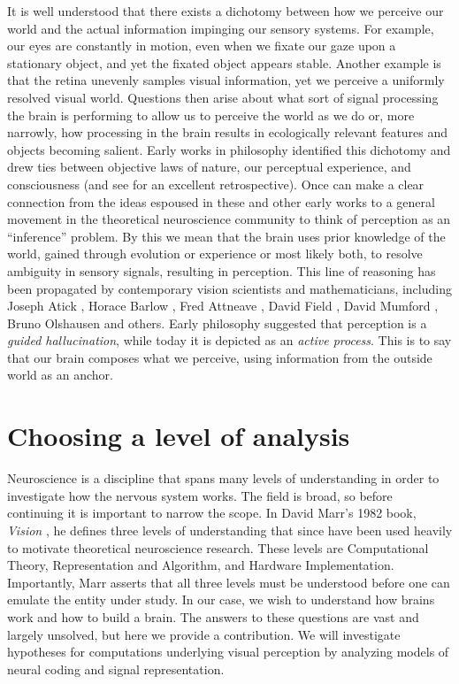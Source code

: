 It is well understood that there exists a dichotomy between how we perceive our world and the actual information impinging our sensory systems. For example, our eyes are constantly in motion, even when we fixate our gaze upon a stationary object, and yet the fixated object appears stable. Another example is that the retina unevenly samples visual information, yet we perceive a uniformly resolved visual world. Questions then arise about what sort of signal processing the brain is performing to allow us to perceive the world as we do or, more narrowly, how processing in the brain results in ecologically relevant features and objects becoming salient. Early works in philosophy identified this dichotomy and drew ties between objective laws of nature, our perceptual experience, and consciousness \parencite{kant1790critique, helmholtz1878facts} (and see \parencite{westheimer2008helmholtz} for an excellent retrospective). Once can make a clear connection from the ideas espoused in these and other early works to a general movement in the theoretical neuroscience community to think of perception as an ``inference'' problem. By this we mean that the brain uses prior knowledge of the world, gained through evolution or experience or most likely both, to resolve ambiguity in sensory signals, resulting in perception. This line of reasoning has been propagated by contemporary vision scientists and mathematicians, including Joseph Atick \citeyearpar{atick1990towards}, Horace Barlow \citeyearpar{barlow2001redundancy}, Fred Attneave \citeyearpar{attneave1954some}, David Field \citeyearpar{field1994goal}, David Mumford \citeyearpar{mumford1994pattern}, Bruno Olshausen \citeyearpar{olshausen2013perception} and others. Early philosophy suggested that perception is a \textit{guided hallucination}, while today it is depicted as an \textit{active process}. This is to say that our brain composes what we perceive, using information from the outside world as an anchor.


\section{Choosing a level of analysis}
Neuroscience is a discipline that spans many levels of understanding in order to investigate how the nervous system works. The field is broad, so before continuing it is important to narrow the scope. In David Marr's 1982 book, \textit{Vision} \citeyearpar{marr1982vision}, he defines three levels of understanding that since have been used heavily to motivate theoretical neuroscience research. These levels are Computational Theory, Representation and Algorithm, and Hardware Implementation. Importantly, Marr asserts that all three levels must be understood before one can emulate the entity under study. In our case, we wish to understand how brains work and how to build a brain. The answers to these questions are vast and largely unsolved, but here we provide a contribution. We will investigate hypotheses for computations underlying visual perception by analyzing models of neural coding and signal representation.

